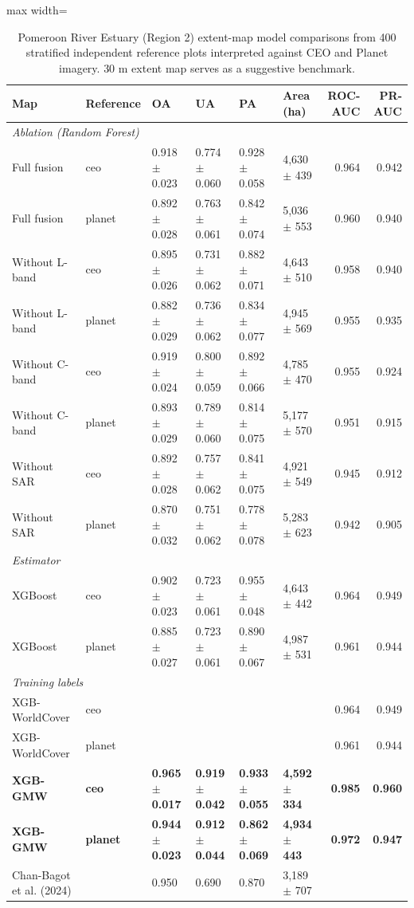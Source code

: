 \begin{table}[htbp]
\centering
\caption{Pomeroon River Estuary (Region 2) extent-map model comparisons from 400 
stratified independent reference plots interpreted against CEO and Planet imagery. \textcite{Chan2024} 30 m extent map serves as a suggestive benchmark.} 
\label{tab:region2-results}
\begin{adjustbox}{max width=\textwidth}
\begin{tabular}{llllllrr}
\toprule
Map & Reference & OA & UA & PA & Area (ha) & ROC-AUC & PR-AUC \\
\midrule
\multicolumn{8}{l}{\textit{Ablation (Random Forest)}} \\
Full fusion & ceo & 0.918 $\pm$ 0.023 & 0.774 $\pm$ 0.060 & 0.928 $\pm$ 0.058 & 4,630 $\pm$ 439 & 0.964 & 0.942 \\
Full fusion & planet & 0.892 $\pm$ 0.028 & 0.763 $\pm$ 0.061 & 0.842 $\pm$ 0.074 & 5,036 $\pm$ 553 & 0.960 & 0.940 \\
Without L-band & ceo & 0.895 $\pm$ 0.026 & 0.731 $\pm$ 0.062 & 0.882 $\pm$ 0.071 & 4,643 $\pm$ 510 & 0.958 & 0.940 \\
Without L-band & planet & 0.882 $\pm$ 0.029 & 0.736 $\pm$ 0.062 & 0.834 $\pm$ 0.077 & 4,945 $\pm$ 569 & 0.955 & 0.935 \\
Without C-band & ceo & 0.919 $\pm$ 0.024 & 0.800 $\pm$ 0.059 & 0.892 $\pm$ 0.066 & 4,785 $\pm$ 470 & 0.955 & 0.924 \\
Without C-band & planet & 0.893 $\pm$ 0.029 & 0.789 $\pm$ 0.060 & 0.814 $\pm$ 0.075 & 5,177 $\pm$ 570 & 0.951 & 0.915 \\
Without SAR & ceo & 0.892 $\pm$ 0.028 & 0.757 $\pm$ 0.062 & 0.841 $\pm$ 0.075 & 4,921 $\pm$ 549 & 0.945 & 0.912 \\
Without SAR & planet & 0.870 $\pm$ 0.032 & 0.751 $\pm$ 0.062 & 0.778 $\pm$ 0.078 & 5,283 $\pm$ 623 & 0.942 & 0.905 \\
\midrule
\multicolumn{8}{l}{\textit{Estimator}} \\
XGBoost & ceo & 0.902 $\pm$ 0.023 & 0.723 $\pm$ 0.061 & 0.955 $\pm$ 0.048 & 4,643 $\pm$ 442 & 0.964 & 0.949 \\
XGBoost & planet & 0.885 $\pm$ 0.027 & 0.723 $\pm$ 0.061 & 0.890 $\pm$ 0.067 & 4,987 $\pm$ 531 & 0.961 & 0.944 \\
\midrule
\multicolumn{8}{l}{\textit{Training labels}} \\
XGB-WorldCover & ceo &  &  &  &  & 0.964 & 0.949 \\
XGB-WorldCover & planet &  &  &  &  & 0.961 & 0.944 \\
\textbf{XGB-GMW} & \textbf{ceo} & \textbf{0.965 $\pm$ 0.017} & \textbf{0.919 $\pm$ 0.042} & \textbf{0.933 $\pm$ 0.055} & \textbf{4,592 $\pm$ 334} & \textbf{0.985} & \textbf{0.960} \\
\textbf{XGB-GMW} & \textbf{planet} & \textbf{0.944 $\pm$ 0.023} & \textbf{0.912 $\pm$ 0.044} & \textbf{0.862 $\pm$ 0.069} & \textbf{4,934 $\pm$ 443} & \textbf{0.972} & \textbf{0.947} \\
Chan-Bagot et al. (2024) &  & 0.950 & 0.690 & 0.870 & 3,189 $\pm$ 707 &  &  \\
\bottomrule
\end{tabular}
\end{adjustbox}
\end{table}